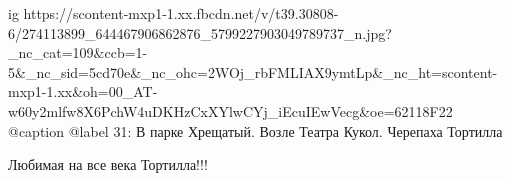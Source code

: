  
 
 
 
 

\ifcmt
  ig https://scontent-mxp1-1.xx.fbcdn.net/v/t39.30808-6/274113899_644467906862876_5799227903049789737_n.jpg?_nc_cat=109&ccb=1-5&_nc_sid=5cd70e&_nc_ohc=2WOj_rbFMLIAX9ymtLp&_nc_ht=scontent-mxp1-1.xx&oh=00_AT-w60y2mlfw8X6PchW4uDKHzCxXYlwCYj_iEcuIEwVecg&oe=62118F22
  @caption @label 31: В парке Хрещатый. Возле Театра Кукол. Черепаха Тортилла
\fi

Любимая на все века Тортилла!!!
